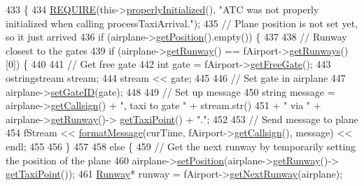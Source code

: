 \begin{DoxyCode}
433                                                              \{
434     \hyperlink{DesignByContract_8h_aeb774672b46dbe80afc14e0d1970f017}{REQUIRE}(this->\hyperlink{classATC_a6b6a10a87c06028bd96d6e5efff170b7}{properlyInitialized}(), \textcolor{stringliteral}{"ATC was not properly initialized when
       calling processTaxiArrival."});
435     \textcolor{comment}{// Plane position is not set yet, so it just arrived}
436     \textcolor{keywordflow}{if} (airplane->\hyperlink{classAirplane_ab4fa66c0adb05725a51524265f8c520c}{getPosition}().empty()) \{
437 
438         \textcolor{comment}{// Runway closest to the gates}
439         \textcolor{keywordflow}{if} (airplane->\hyperlink{classAirplane_ab6dda72f7cfd29a7334e0494d184bbfa}{getRunway}() == fAirport->\hyperlink{classAirport_a14310ffeba8a024105071c156fd42cf7}{getRunways}()[0]) \{
440 
441             \textcolor{comment}{// Get free gate}
442             \textcolor{keywordtype}{int} gate = fAirport->\hyperlink{classAirport_a73b57b192084fb8082d912da70beb5b0}{getFreeGate}();
443             ostringstream stream;
444             stream << gate;
445 
446             \textcolor{comment}{// Set gate in airplane}
447             airplane->\hyperlink{classAirplane_aed585c73c9dd5065bd1f8b55236260a0}{setGateID}(gate);
448 
449             \textcolor{comment}{// Set up message}
450             \textcolor{keywordtype}{string} message = airplane->\hyperlink{classAirplane_a6a62bd06d28789336c5ce1543d9391f1}{getCallsign}() + \textcolor{stringliteral}{", taxi to gate "} + stream.str()
451                              + \textcolor{stringliteral}{" via "} + airplane->\hyperlink{classAirplane_ab6dda72f7cfd29a7334e0494d184bbfa}{getRunway}()->
      \hyperlink{classRunway_ad2d8fd5696ec93e2fa3d32bec3d02f59}{getTaxiPoint}() + \textcolor{stringliteral}{"."};
452 
453             \textcolor{comment}{// Send message to plane}
454             fStream << \hyperlink{classATC_a2fca67fc154c7d8a6c14198697653059}{formatMessage}(curTime, fAirport->\hyperlink{classAirport_a6ed56e05a8c881b8e4718a34ba9cccc5}{getCallsign}(), message) << 
      endl;
455 
456         \}
457 
458         \textcolor{keywordflow}{else} \{
459             \textcolor{comment}{// Get the next runway by temporarily setting the position of the plane}
460             airplane->\hyperlink{classAirplane_a656e916c30af73584f781e7e2e28e78a}{setPosition}(airplane->\hyperlink{classAirplane_ab6dda72f7cfd29a7334e0494d184bbfa}{getRunway}()->
      \hyperlink{classRunway_ad2d8fd5696ec93e2fa3d32bec3d02f59}{getTaxiPoint}());
461             \hyperlink{classRunway}{Runway}* runway = fAirport->\hyperlink{classAirport_a894669e2c8865a6c0442004e7e75063c}{getNextRunway}(airplane);

\end{DoxyCode}

